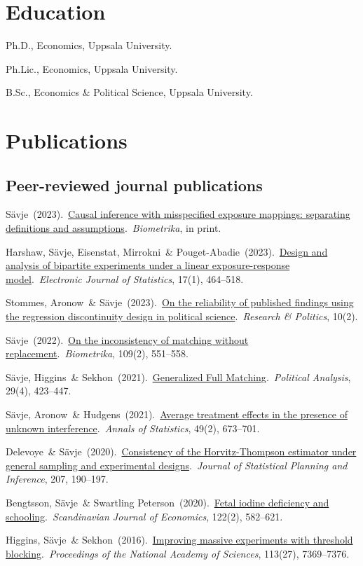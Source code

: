 \documentclass[10pt,letterpaper]{article}
\newenvironment{singledatelist}{
	\begin{list}{}{
		\setlength{\parskip}{0pt}
		\setlength{\itemsep}{4pt}
		\setlength{\parsep}{0.3em}
		\setlength{\leftmargin}{3.5em}
		\setlength{\labelwidth}{3.5em}
		\setlength{\labelsep}{1.5em}
		}
	}{
\end{list}
}
\newcommand{\dateitem}[2][]{\item[{#1}] {#2}}
\newenvironment{infolist}{
	\begin{list}{}{
		\setlength{\parskip}{0pt}
		\setlength{\itemsep}{4pt}
		\setlength{\parsep}{0.3em}
		\setlength{\leftmargin}{0em}
		\setlength{\labelwidth}{0em}
		}
	}{
\end{list}
}
\newcommand{\infoitem}[1]{\item {#1}}
\begin{document}
	\section*{Education}

	\begin{singledatelist}
		\dateitem[2015]{Ph.D., Economics, Uppsala University.}
		\dateitem[2013]{Ph.Lic., Economics, Uppsala University.}
		\dateitem[2010]{B.Sc., Economics \& Political Science, Uppsala University.}
	\end{singledatelist}


	\section*{Publications}

	\subsection*{Peer-reviewed journal publications}

	\begin{infolist}
		\infoitem{Sävje\ (2023).\ \href{https://doi.org/10.1093/biomet/asad019}{Causal inference with misspecified exposure mappings: separating definitions and assumptions}.\ \textit{Biometrika}, in print.}
		\infoitem{Harshaw, Sävje, Eisenstat, Mirrokni\ \& Pouget-Abadie\ (2023).\ \href{https://doi.org/10.1214/23-EJS2111}{Design and analysis of bipartite experiments under a linear exposure-response model}.\ \textit{Electronic Journal of Statistics}, 17(1), 464--518.}
		\infoitem{Stommes, Aronow\ \& Sävje\ (2023).\ \href{https://doi.org/10.1177/20531680231166457}{On the reliability of published findings using the regression discontinuity design in political science}.\ \textit{Research \& Politics}, 10(2).}
		\infoitem{Sävje\ (2022).\ \href{https://doi.org/10.1093/biomet/asab035}{On the inconsistency of matching without replacement}.\ \textit{Biometrika}, 109(2), 551--558.}
		\infoitem{Sävje, Higgins\ \& Sekhon\ (2021).\ \href{https://doi.org/10.1017/pan.2020.32}{Generalized Full Matching}.\ \textit{Political Analysis}, 29(4), 423--447.}
		\infoitem{Sävje, Aronow\ \& Hudgens\ (2021).\ \href{https://projecteuclid.org/journals/annals-of-statistics/volume-49/issue-2/Average-treatment-effects-in-the-presence-of-unknown-interference/10.1214/20-AOS1973.short}{Average treatment effects in the presence of unknown interference}.\ \textit{Annals of Statistics}, 49(2), 673--701.}
		\infoitem{Delevoye\ \& Sävje\ (2020).\ \href{https://www.sciencedirect.com/science/article/pii/S0378375819301211}{Consistency of the Horvitz-Thompson estimator under general sampling and experimental designs}.\ \textit{Journal of Statistical Planning and Inference}, 207, 190--197.}
		\infoitem{Bengtsson, Sävje\ \& Swartling Peterson\ (2020).\ \href{https://onlinelibrary.wiley.com/doi/abs/10.1111/sjoe.12341}{Fetal iodine deficiency and schooling}.\ \textit{Scandinavian Journal of Economics}, 122(2), 582--621.}
		\infoitem{Higgins, Sävje\ \& Sekhon\ (2016).\ \href{https://www.pnas.org/content/113/27/7369}{Improving massive experiments with threshold blocking}.\ \textit{Proceedings of the National Academy of Sciences}, 113(27), 7369--7376.}
	\end{infolist}
\end{document}
